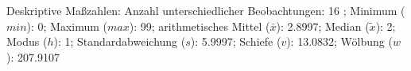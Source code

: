 				\label{tableValues:prsa043a}
				\vspace*{-\baselineskip}
                    \begin{noten}
                	    \note{} Deskriptive Maßzahlen:
                	    Anzahl unterschiedlicher Beobachtungen: 16%
                	    ; 
                	      Minimum ($min$): 0; 
                	      Maximum ($max$): 99; 
                	      arithmetisches Mittel ($\bar{x}$): \num[round-mode=places,round-precision=2]{2.8997}; 
                	      Median ($\tilde{x}$): 2; 
                	      Modus ($h$): 1; 
                	      Standardabweichung ($s$): \num[round-mode=places,round-precision=2]{5.9997}; 
                	      Schiefe ($v$): \num[round-mode=places,round-precision=2]{13.0832}; 
                	      Wölbung ($w$): \num[round-mode=places,round-precision=2]{207.9107}
                     \end{noten}

